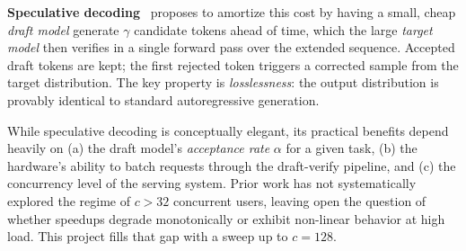 \documentclass[10pt,twocolumn]{article}
\begin{document}
\textbf{Speculative decoding}~\cite{leviathan2023fast,chen2023accelerating}
proposes to amortize this cost by having a small, cheap \emph{draft model}
generate $\gamma$ candidate tokens ahead of time, which the large \emph{target
model} then verifies in a single forward pass over the extended sequence.
Accepted draft tokens are kept; the first rejected token triggers a corrected
sample from the target distribution.  The key property is \emph{losslessness}:
the output distribution is provably identical to standard autoregressive
generation.

While speculative decoding is conceptually elegant, its practical benefits
depend heavily on (a) the draft model's \emph{acceptance rate} $\alpha$ for a
given task, (b) the hardware's ability to batch requests through the
draft-verify pipeline, and (c) the concurrency level of the serving system.
Prior work has not systematically explored the regime of $c > 32$ concurrent
users, leaving open the question of whether speedups degrade monotonically or
exhibit non-linear behavior at high load.  This project fills that gap with
a sweep up to $c = 128$.

\end{document}
